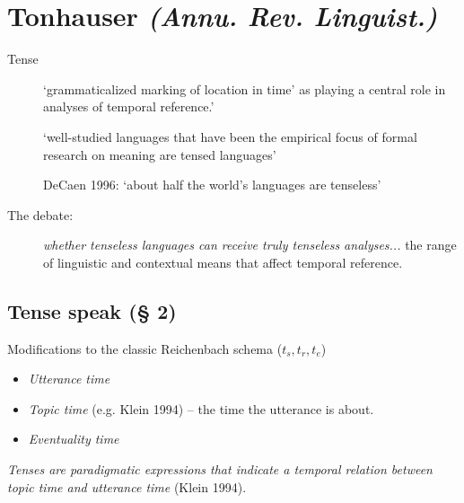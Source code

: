 \documentclass[10pt]{article}
\begin{document}
\section{\textbf{Tonhauser} \textit{(Annu. Rev. Linguist.)}}
\begin{description}
\item[Tense] `grammaticalized marking of location in time' as playing a central role in analyses of temporal reference.'

`well-studied languages that have been the empirical focus of formal research on meaning are tensed languages'

DeCaen 1996: `about half the world's languages are tenseless'

\item[The debate:] \textit{whether tenseless languages can receive truly tenseless analyses...} the range of linguistic and contextual means that affect temporal reference.
\end{description}

\subsection{Tense speak (§ 2)} 

Modifications to the classic Reichenbach schema ($t_s,t_r,t_e$)
\begin{itemize}

	\item \textit{Utterance time}
	\item \textit{Topic time} (e.g. Klein 1994) -- the time the utterance is about.
	\item \textit{Eventuality time}
\end{itemize}

\textit{Tenses are paradigmatic expressions that indicate a temporal relation between topic time and utterance time} (Klein 1994).
 
\end{document}
